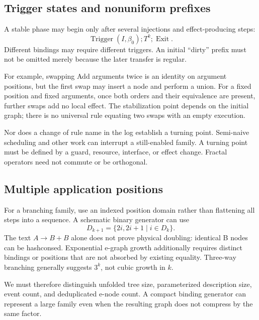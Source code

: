 \documentclass[11pt,a4paper]{article}
\begin{document}
\MathFractalBinding

\subsection{Trigger states and nonuniform prefixes}
A stable phase may begin only after several injections and effect-producing
steps:
\begin{equation}
 \operatorname{Trigger}(I,\beta_0);T^k;\operatorname{Exit}.
\end{equation}
Different bindings may require different triggers. An initial ``dirty'' prefix
must not be omitted merely because the later transfer is regular.

For example, swapping Add arguments twice is an identity on argument positions,
but the first swap may insert a node and perform a union. For a fixed position
and fixed arguments, once both orders and their equivalence are present, further
swaps add no local effect. The stabilization point depends on the initial graph;
there is no universal rule equating two swaps with an empty execution.

Nor does a change of rule name in the log establish a turning point. Semi-naive
scheduling and other work can interrupt a still-enabled family. A turning point
must be defined by a guard, resource, interface, or effect change. Fractal
operators need not commute or be orthogonal.

\MathTrigger

\subsection{Multiple application positions}
For a branching family, use an indexed position domain rather than flattening all
steps into a sequence. A schematic binary generator can use
\begin{equation}
 D_{k+1}=\{2i,2i+1\mid i\in D_k\}.
\end{equation}
The text $A\to B+B$ alone does not prove physical doubling: identical B nodes
can be hashconsed. Exponential e-graph growth additionally requires distinct
bindings or positions that are not absorbed by existing equality. Three-way
branching generally suggests $3^k$, not cubic growth in $k$.

We must therefore distinguish unfolded tree size, parameterized description
size, event count, and deduplicated e-node count. A compact binding generator can
represent a large family even when the resulting graph does not compress by the
same factor.
\end{document}
